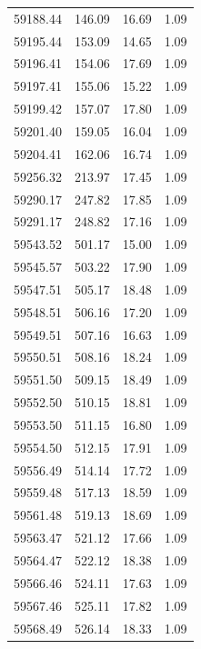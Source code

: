 \begin{longtable}{|c|c|c|c|}
 59188.44 &  146.09 &       16.69 &          1.09 \\
 59195.44 &  153.09 &       14.65 &          1.09 \\
 59196.41 &  154.06 &       17.69 &          1.09 \\
 59197.41 &  155.06 &       15.22 &          1.09 \\
 59199.42 &  157.07 &       17.80 &          1.09 \\
 59201.40 &  159.05 &       16.04 &          1.09 \\
 59204.41 &  162.06 &       16.74 &          1.09 \\
 59256.32 &  213.97 &       17.45 &          1.09 \\
 59290.17 &  247.82 &       17.85 &          1.09 \\
 59291.17 &  248.82 &       17.16 &          1.09 \\
 59543.52 &  501.17 &       15.00 &          1.09 \\
 59545.57 &  503.22 &       17.90 &          1.09 \\
 59547.51 &  505.17 &       18.48 &          1.09 \\
 59548.51 &  506.16 &       17.20 &          1.09 \\
 59549.51 &  507.16 &       16.63 &          1.09 \\
 59550.51 &  508.16 &       18.24 &          1.09 \\
 59551.50 &  509.15 &       18.49 &          1.09 \\
 59552.50 &  510.15 &       18.81 &          1.09 \\
 59553.50 &  511.15 &       16.80 &          1.09 \\
 59554.50 &  512.15 &       17.91 &          1.09 \\
 59556.49 &  514.14 &       17.72 &          1.09 \\
 59559.48 &  517.13 &       18.59 &          1.09 \\
 59561.48 &  519.13 &       18.69 &          1.09 \\
 59563.47 &  521.12 &       17.66 &          1.09 \\
 59564.47 &  522.12 &       18.38 &          1.09 \\
 59566.46 &  524.11 &       17.63 &          1.09 \\
 59567.46 &  525.11 &       17.82 &          1.09 \\
 59568.49 &  526.14 &       18.33 &          1.09 \\
\hline
\end{longtable}




